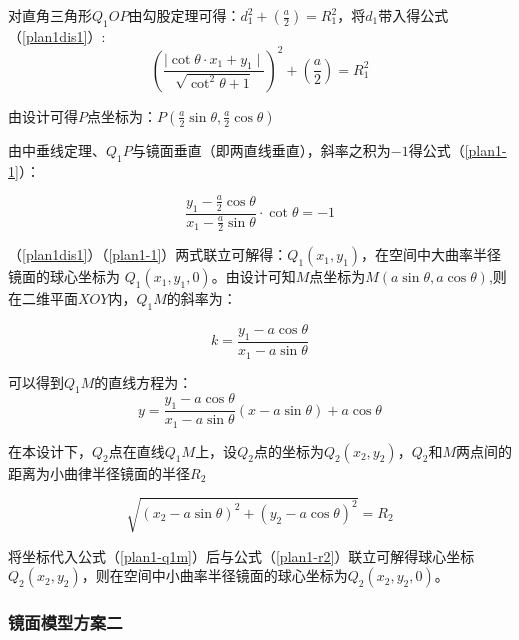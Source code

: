 \documentclass[withoutpreface,bwprint]{cumcmthesis} %
\begin{document}
\par 对直角三角形$Q_1OP$由勾股定理可得：$ d_1^2 + \left( \frac{a}{2} \right) = R_1^2$，将$d_1$带入得公式（\ref{plan1dis1}）:
\begin{equation}
\label{plan1dis1}
	\left( \frac{\mid \mathop{cot}\theta \cdot x_1 + y_1 \mid}{\sqrt{\mathop{cot}^{2} \theta + 1}} \right)^2 +\left( \frac{a}{2} \right) = R_1^2
\end{equation}

\par 由设计可得$P$点坐标为：$P(\frac{a}{2} \mathop{sin} \theta, \frac{a}{2} \mathop{cos} \theta)$

\par 由中垂线定理、$Q_1P$与镜面垂直（即两直线垂直），斜率之积为$-1$得公式（\ref{plan1-1}）：

\begin{equation}
\label{plan1-1}
	\frac{y_1 - \frac{a}{2} \mathop{cos} \theta}{x_1 - \frac{a}{2} \mathop{sin} \theta} \cdot \mathop{cot}\theta = -1
\end{equation}

\par （\ref{plan1dis1}）（\ref{plan1-1}）两式联立可解得：$Q_1(x_1,y_1)$，在空间中大曲率半径镜面的球心坐标为 $Q_1(x_1,y_1,0)$。由设计可知$M$点坐标为$M(a \mathop{sin} \theta, a \mathop{cos} \theta)$,则在二维平面$XOY$内，$Q_1M$的斜率为：

$$k = \frac{y_1 - a \mathop{cos} \theta}{x_1 - a \mathop{sin} \theta}$$
 
\par 可以得到$Q_1M$的直线方程为：
\begin{equation}
\label{plan1-q1m}
	y = \frac{y_1 - a \mathop{cos} \theta}{x_1 - a \mathop{sin} \theta} (x - a \mathop{sin} \theta ) + a \mathop{cos} \theta
\end{equation}

在本设计下，$Q_2$点在直线$Q_1M$上，设$Q_2$点的坐标为$Q_2(x_2, y_2)$，$Q_2$和$M$两点间的距离为小曲律半径镜面的半径$R_2$

\begin{equation}
\label{plan1-r2}
	\sqrt{(x_2 - a \mathop{sin}\theta )^2 + (y_2 - a \mathop{cos}\theta )^2} = R_2
\end{equation}
\par 将坐标代入公式（\ref{plan1-q1m}）后与公式（\ref{plan1-r2}）联立可解得球心坐标$Q_2(x_2,y_2)$，则在空间中小曲率半径镜面的球心坐标为$Q_2(x_2,y_2,0)$。


\subsubsection{镜面模型方案二}
\end{document}
